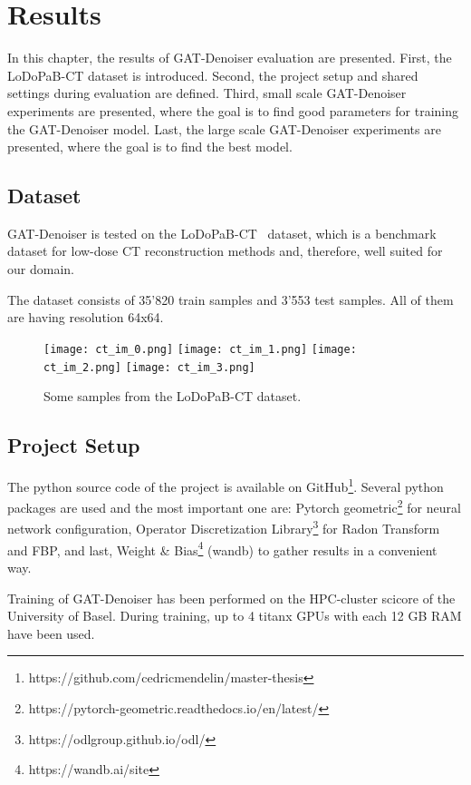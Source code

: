 \chapter{Results}
\label{sec:results}

In this chapter, the results of GAT-Denoiser evaluation are presented.
First, the LoDoPaB-CT dataset is introduced.
Second, the project setup and shared settings during evaluation are defined.
Third, small scale GAT-Denoiser experiments are presented, where the goal is to find
good parameters for training the GAT-Denoiser model. 
Last, the large scale GAT-Denoiser experiments are presented, where the goal is 
to find the best model.



\section{Dataset}
GAT-Denoiser is tested on the LoDoPaB-CT~\cite{lodopab-dataset} dataset, which is a 
benchmark dataset for low-dose CT reconstruction methods and, therefore, well suited for our domain.

The dataset consists of 35'820 train samples and 3'553 test samples.
All of them are having resolution 64x64.

\begin{figure}[H]
  \centering
  \hfill
  \texttt{[image: ct\_im\_0.png]}
  \hfill
  \texttt{[image: ct\_im\_1.png]}
  \hfill
  \texttt{[image: ct\_im\_2.png]}
  \hfill
  \texttt{[image: ct\_im\_3.png]}
  \hfill
  \caption{Some samples from the LoDoPaB-CT dataset.}
\end{figure}



\section{Project Setup}
The python source code of the project is available on GitHub\footnote{https://github.com/cedricmendelin/master-thesis}.
Several python packages are used and the most important one are: Pytorch geometric\footnote{https://pytorch-geometric.readthedocs.io/en/latest/} 
for neural network configuration, Operator Discretization Library\footnote{https://odlgroup.github.io/odl/} for Radon Transform and FBP, 
and last, Weight \& Bias\footnote{https://wandb.ai/site} (wandb) to gather results in a convenient way.

Training of GAT-Denoiser has been performed on the HPC-cluster scicore of the University of Basel.
During training, up to 4 titanx GPUs with each 12 GB RAM have been used.


